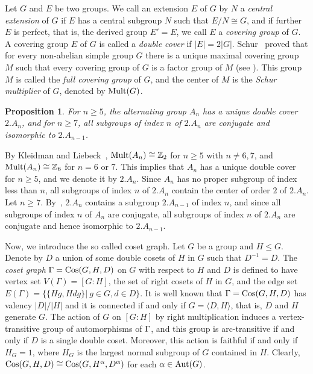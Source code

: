 \documentclass[12pt]{article}
\newtheorem{prop}[lem]{Proposition}%
\def\f{\noindent}
\def\Aut{\hbox{\rm Aut}}
\def\Cos{\hbox{\rm Cos}}
\newcommand{\qed}{\mbox{\raisebox{0.7ex}{\fbox{}}} \vspace{4truemm}}
\def\mz{{\mathbb Z}}
\begin{document}
Let $G$ and $E$ be two groups. We call an extension $E$ of $G$ by $N$ a {\em central extension} of $G$ if $E$ has a central subgroup $N$ such that $E/N\cong G$, and if further $E$ is perfect, that is, the derived group $E'=E$, we call $E$ a {\em covering group} of $G$. A covering group $E$ of $G$ is called a {\em double cover} if $|E|=2|G|$. Schur~\cite{Schur} proved that for every non-abelian simple group $G$ there is a unique maximal covering group $M$ such that every covering group of $G$ is a factor group of $M$ (see \cite[Kapitel V, \S23]{Huppert}). This group $M$ is called the {\em full covering group} of $G$, and the center of $M$ is the {\em Schur multiplier} of $G$, denoted by $\hbox{\rm Mult}(G)$.

\begin{prop}\label{prop=covering group} For $n\geq 5$, the alternating group $A_n$ has a unique double cover $2.A_n$, and for $n\geq 7$,   all subgroups of index $n$ of $2.A_n$ are conjugate and isomorphic to $2.A_{n-1}$.
\end{prop}

\f {\bf Proof:} By Kleidman and Liebeck~\cite[Theorem 5.1.4]{Kleidman}, $\Mult(A_n)\cong \mz_2$ for $n\geq 5$ with $n\not=6,7$,  and $\Mult(A_n)\cong \mz_6$ for $n=6$ or $7$. This implies that $A_n$ has a unique double cover for $n\geq 5$, and we denote it by $2.A_n$. Since $A_n$ has no proper subgroup of index less than $n$, all subgroups of index $n$ of $2.A_n$ contain the center of order $2$ of  $2.A_n$. Let $n\geq 7$. By~\cite[2.7.2]{Wilson}, $2.A_n$ contains a subgroup $2.A_{n-1}$ of index $n$, and since all subgroups of index $n$ of $A_n$ are conjugate, all subgroups of index $n$ of $2.A_n$ are conjugate and hence isomorphic to $2.A_{n-1}$.
\hfill\qed

Now, we introduce the so called coset graph. Let $G$ be a group and $H\leq G$. Denote by $D$ a union of some double cosets of $H$ in $G$ such that $D^{-1}=D$. The \emph{coset graph} $ \Gamma=\Cos(G,H,D)$ on $G$ with respect to $H$ and $D$ is defined to have vertex set $V(\Gamma)=[G:H]$, the set of right cosets of $H$ in $G$, and the edge set $E(\Gamma)=\{\{Hg,Hdg\}|~g\in G,d\in D\}$. It is well known that
$ \Gamma=\Cos(G,H,D)$ has valency $|D|/|H|$ and it is connected if and only if $G=\langle D,H\rangle$, that is, $D$ and $H$ generate $G$.
The action of $G$ on $[G:H]$ by right multiplication induces a vertex-transitive group of automorphisms of $\Gamma$, and this group is arc-transitive if and only if $D$ is a single double coset. Moreover, this action is faithful if and only if $H_G=1$, where $H_{G}$ is the largest normal subgroup of $G$ contained in $H$. Clearly, $\Cos(G,H,D)\cong \Cos(G,H^{\alpha},D^{\alpha})$ for each $\alpha \in \Aut(G)$.
\end{document}
